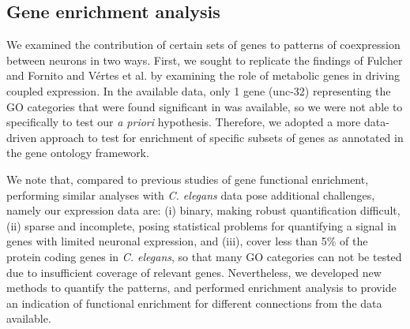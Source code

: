\documentclass[10pt,letterpaper]{article}
\begin{document}
\subsection*{Gene enrichment analysis}
We examined the contribution of certain sets of genes to patterns of coexpression between neurons in two ways.
First, we sought to replicate the findings of Fulcher and Fornito \cite{Fulcher:2016ck} and V\'ertes et al. \cite{Vertes2016a} by examining the role of metabolic genes in driving coupled expression.
In the available data, only 1 gene (unc-32) representing the GO categories that were found significant in \cite{Fulcher:2016ck} was available, so we were not able to specifically to test our \emph{a priori} hypothesis.
Therefore, we adopted a more data-driven approach to test for enrichment of specific subsets of genes as annotated in the gene ontology framework.

We note that, compared to previous studies of gene functional enrichment, performing similar analyses with \emph{C. elegans} data pose additional challenges, namely our expression data are:
(i) binary, making robust quantification difficult,
(ii) sparse and incomplete, posing statistical problems for quantifying a signal in genes with limited neuronal expression,
and (iii), cover less than 5\% of the protein coding genes in \emph{C. elegans}, so that many GO categories can not be tested due to insufficient coverage of relevant genes.
Nevertheless, we developed new methods to quantify the patterns, and performed enrichment analysis to provide an indication of functional enrichment for different connections from the data available.
\end{document}
